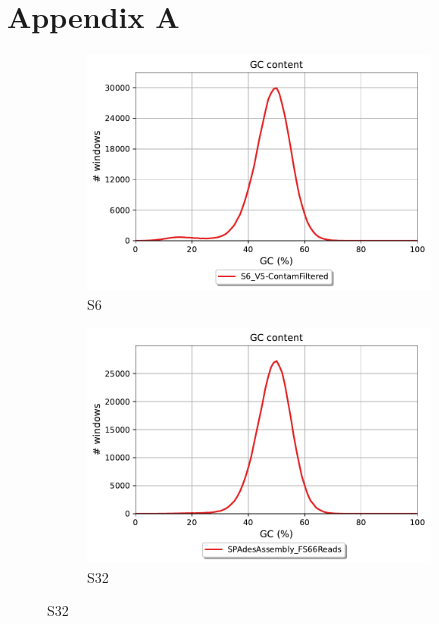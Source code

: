 \captionsetup{subrefformat=parens}
\newpage
\section{Appendix A}

\label{apx:GCContents}
\begin{figure}[h!]
    \centering
    \begin{subfigure}[]{0.49\textwidth}
        \centering
        \includegraphics[width=\textwidth]{Figures/S6_GC_content_plot.pdf}
        \caption{S6}
        \label{fig:S6GC}
    \end{subfigure}
    \begin{subfigure}[]{0.49\textwidth}
        \centering
        \includegraphics[width=\textwidth]{Figures/S32_GC_content_plot.pdf}
        \caption{S32}
        \label{fig:S32GC}
    \end{subfigure}

\end{figure}
